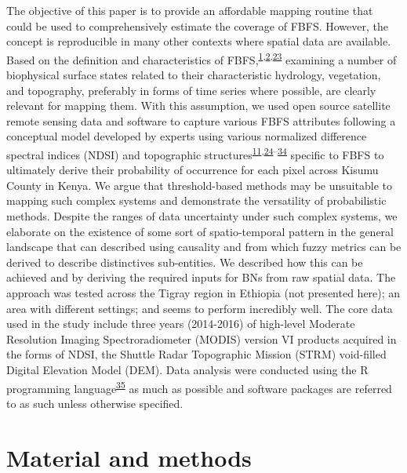 \documentclass[12pt,oneside]{article}
\begin{document}
The objective of this paper is to provide an affordable mapping routine that could be used to comprehensively estimate the coverage of FBFS. However, the concept is reproducible in many other contexts where spatial data are available. Based on the definition and characteristics of FBFS,\textsuperscript{\protect\hyperlink{ref-Puertas_et_al_2011}{1},\protect\hyperlink{ref-VanSteenbergen_et_al_2010}{2},\protect\hyperlink{ref-VanSteenbergen_et_al_2011}{23}} examining a number of biophysical surface states related to their characteristic hydrology, vegetation, and topography, preferably in forms of time series where possible, are clearly relevant for mapping them. With this assumption, we used open source satellite remote sensing data and software to capture various FBFS attributes following a conceptual model developed by experts using various normalized difference spectral indices (NDSI) and topographic structures\textsuperscript{\protect\hyperlink{ref-Wegmann_et_al_2016}{11},\protect\hyperlink{ref-Arge_et_al_2003}{24}--\protect\hyperlink{ref-Yang_et_al_2006}{34}} specific to FBFS to ultimately derive their probability of occurrence for each pixel across Kisumu County in Kenya. We argue that threshold-based methods may be unsuitable to mapping such complex systems and demonstrate the versatility of probabilistic methods. Despite the ranges of data uncertainty under such complex systems, we elaborate on the existence of some sort of spatio-temporal pattern in the general landscape that can described using causality and from which fuzzy metrics can be derived to describe distinctives sub-entities. We described how this can be achieved and by deriving the required inputs for BNs from raw spatial data. The approach was tested across the Tigray region in Ethiopia (not presented here); an area with different settings; and seems to perform incredibly well. The core data used in the study include three years (2014-2016) of high-level Moderate Resolution Imaging Spectroradiometer (MODIS) version VI products acquired in the forms of NDSI, the Shuttle Radar Topographic Mission (STRM) void-filled Digital Elevation Model (DEM). Data analysis were conducted using the R programming language\textsuperscript{\protect\hyperlink{ref-RCoreTeam_2018}{35}} as much as possible and software packages are referred to as such unless otherwise specified.

\hypertarget{I}{%
\section{Material and methods}\label{I}}
\end{document}

